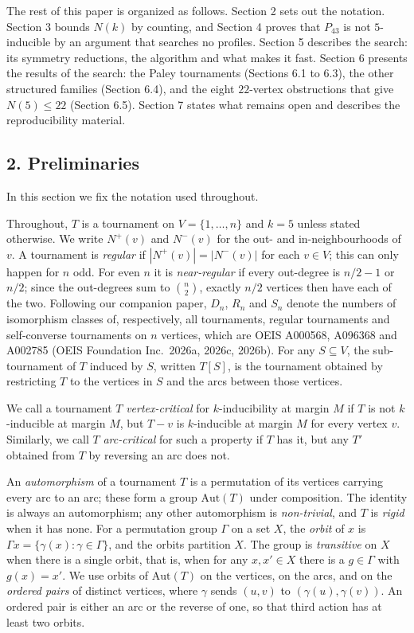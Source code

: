 \documentclass[
]{article}
\newcounter{none} %
\begin{document}
The rest of this paper is organized as follows. Section 2 sets out the
notation. Section 3 bounds \(N(k)\) by counting, and Section 4 proves
that \(P_{43}\) is not \(5\)-inducible by an argument that searches no
profiles. Section 5 describes the search: its symmetry reductions, the
algorithm and what makes it fast. Section 6 presents the results of the
search: the Paley tournaments (Sections 6.1 to 6.3), the other
structured families (Section 6.4), and the eight \(22\)-vertex
obstructions that give \(N(5) \le 22\) (Section 6.5). Section 7 states
what remains open and describes the reproducibility material.

\subsection{2. Preliminaries}\label{preliminaries}

In this section we fix the notation used throughout.

Throughout, \(T\) is a tournament on \(V = \{1, \dots, n\}\) and
\(k = 5\) unless stated otherwise. We write \(N^{+}(v)\) and
\(N^{-}(v)\) for the out- and in-neighbourhoods of \(v\). A tournament
is \emph{regular} if \(|N^{+}(v)| = |N^{-}(v)|\) for each \(v \in V\);
this can only happen for \(n\) odd. For even \(n\) it is
\emph{near-regular} if every out-degree is \(n/2 - 1\) or \(n/2\); since
the out-degrees sum to \(\binom{n}{2}\), exactly \(n/2\) vertices then
have each of the two. Following our companion paper, \(D_n\), \(R_n\)
and \(S_n\) denote the numbers of isomorphism classes of, respectively,
all tournaments, regular tournaments and self-converse tournaments on
\(n\) vertices, which are OEIS A000568, A096368 and A002785 (OEIS
Foundation Inc.~2026a, 2026c, 2026b). For any \(S \subseteq V\), the
sub-tournament of \(T\) induced by \(S\), written \(T[S]\), is the
tournament obtained by restricting \(T\) to the vertices in \(S\) and
the arcs between those vertices.

We call a tournament \(T\) \emph{vertex-critical} for \(k\)-inducibility
at margin \(M\) if \(T\) is not \(k\)-inducible at margin \(M\), but
\(T - v\) is \(k\)-inducible at margin \(M\) for every vertex \(v\).
Similarly, we call \(T\) \emph{arc-critical} for such a property if
\(T\) has it, but any \(T'\) obtained from \(T\) by reversing an arc
does not.

An \emph{automorphism} of a tournament \(T\) is a permutation of its
vertices carrying every arc to an arc; these form a group
\(\mathrm{Aut}(T)\) under composition. The identity is always an
automorphism; any other automorphism is \emph{non-trivial}, and \(T\) is
\emph{rigid} when it has none. For a permutation group \(\Gamma\) on a
set \(X\), the \emph{orbit} of \(x\) is
\(\Gamma x = \{\gamma(x) : \gamma \in \Gamma\}\), and the orbits
partition \(X\). The group is \emph{transitive} on \(X\) when there is a
single orbit, that is, when for any \(x, x' \in X\) there is a
\(g \in \Gamma\) with \(g(x) = x'\). We use orbits of
\(\mathrm{Aut}(T)\) on the vertices, on the arcs, and on the
\emph{ordered pairs} of distinct vertices, where \(\gamma\) sends
\((u,v)\) to \((\gamma(u), \gamma(v))\). An ordered pair is either an
arc or the reverse of one, so that third action has at least two orbits.
\end{document}
